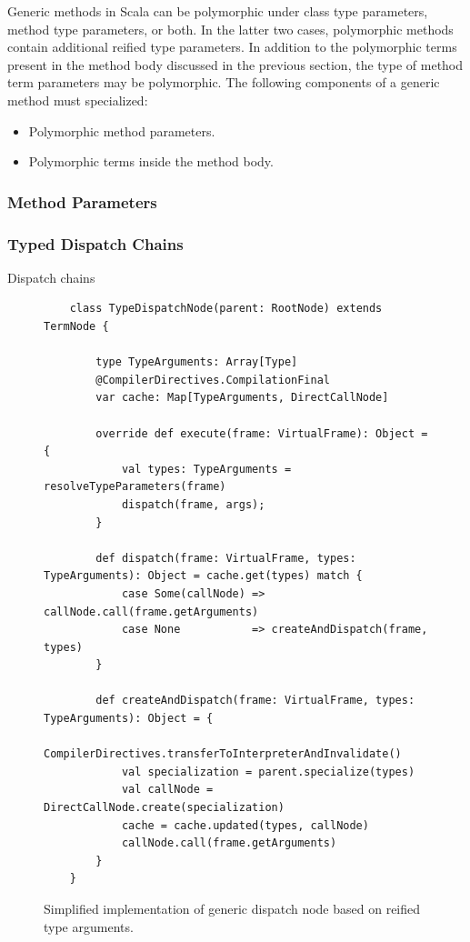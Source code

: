 Generic methods in Scala can be polymorphic under class type parameters, method type parameters, or both. 
In the latter two cases, polymorphic methods contain additional reified type parameters. 
In addition to the polymorphic terms present in the method body discussed in the previous section, the type of method term parameters may be polymorphic. 
The following components of a generic method must specialized:

\begin{itemize}
	\item Polymorphic method parameters.
	\item Polymorphic terms inside the method body.
\end{itemize}


\subsubsection*{Method Parameters}

\subsubsection*{Typed Dispatch Chains}

Dispatch chains\cite{???}

\begin{figure}[H]
	\begin{verbatim}
	class TypeDispatchNode(parent: RootNode) extends TermNode {
		
		type TypeArguments: Array[Type]
		@CompilerDirectives.CompilationFinal
		var cache: Map[TypeArguments, DirectCallNode]
		
		override def execute(frame: VirtualFrame): Object = {
			val types: TypeArguments = resolveTypeParameters(frame)
			dispatch(frame, args);
		}
		
		def dispatch(frame: VirtualFrame, types: TypeArguments): Object = cache.get(types) match {
			case Some(callNode) => callNode.call(frame.getArguments)
			case None           => createAndDispatch(frame, types)
		}
		
		def createAndDispatch(frame: VirtualFrame, types: TypeArguments): Object = {
			CompilerDirectives.transferToInterpreterAndInvalidate()
			val specialization = parent.specialize(types)
			val callNode = DirectCallNode.create(specialization)
			cache = cache.updated(types, callNode)
			callNode.call(frame.getArguments)
		}
	}
	\end{verbatim}
\caption{Simplified implementation of generic dispatch node based on reified type arguments.}
\end{figure}

